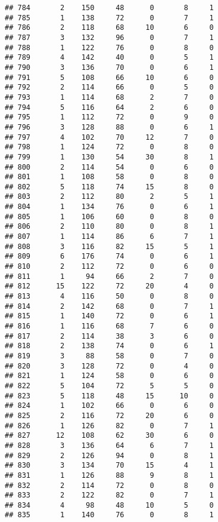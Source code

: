 \documentclass[
]{article}
\begin{document}
\begin{verbatim}
## 784       2    150     48      0       8     1
## 785       1    138     72      0       7     1
## 786       2    118     68     10       6     0
## 787       3    132     96      0       7     1
## 788       1    122     76      0       8     0
## 789       4    142     40      0       5     1
## 790       3    136     70      0       6     1
## 791       5    108     66     10       6     0
## 792       2    114     66      0       5     0
## 793       1    114     68      2       7     0
## 794       5    116     64      2       6     0
## 795       1    112     72      0       9     0
## 796       3    128     88      0       6     1
## 797       4    102     70     12       7     0
## 798       1    124     72      0       8     0
## 799       1    130     54     30       8     1
## 800       2    114     54      0       6     0
## 801       1    108     58      0       8     0
## 802       5    118     74     15       8     0
## 803       2    112     80      2       5     1
## 804       1    134     76      0       6     1
## 805       1    106     60      0       8     0
## 806       2    110     80      0       8     1
## 807       1    114     86      6       7     1
## 808       3    116     82     15       5     1
## 809       6    176     74      0       6     1
## 810       2    112     72      0       6     0
## 811       1     94     66      2       7     0
## 812      15    122     72     20       4     0
## 813       4    116     50      0       8     0
## 814       2    142     68      0       7     1
## 815       1    140     72      0       6     1
## 816       1    116     68      7       6     0
## 817       2    114     38      3       6     0
## 818       2    138     74      0       6     1
## 819       3     88     58      0       7     0
## 820       3    128     72      0       4     0
## 821       1    124     58      0       6     0
## 822       5    104     72      5       5     0
## 823       5    118     48     15      10     0
## 824       1    102     66      0       6     0
## 825       2    116     72     20       6     0
## 826       1    126     82      0       7     1
## 827      12    108     62     30       6     0
## 828       3    136     64      6       7     1
## 829       2    126     94      0       8     1
## 830       3    134     70     15       4     1
## 831       1    126     88      9       8     1
## 832       2    114     72      0       8     0
## 833       2    122     82      0       7     1
## 834       4     98     48     10       5     0
## 835       1    140     76      0       8     1

\end{verbatim}
\end{document}
